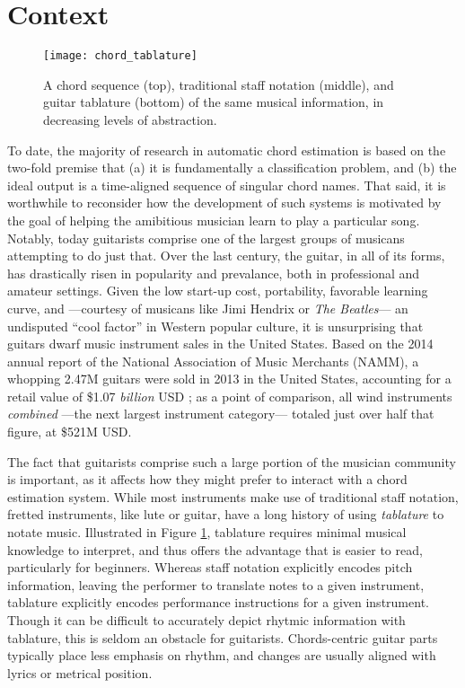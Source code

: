 \section{Context}
\label{sec:context}


\begin{figure}[t!]

  \centering
  \centerline{\texttt{[image: chord\_tablature]}}
\caption{A chord sequence (top), traditional staff notation (middle), and guitar tablature (bottom) of the same musical information, in decreasing levels of abstraction.}
\label{fig:chord_notation}
%
\end{figure}

To date, the majority of research in automatic chord estimation is based on the two-fold premise that (a) it is fundamentally a classification problem, and (b) the ideal output is a time-aligned sequence of singular chord names.
That said, it is worthwhile to reconsider how the development of such systems is motivated by the goal of helping the amibitious musician learn to play a particular song.
Notably, today guitarists comprise one of the largest groups of musicans attempting to do just that.
Over the last century, the guitar, in all of its forms, has drastically risen in popularity and prevalance, both in professional and amateur settings.
Given the low start-up cost, portability, favorable learning curve, and ---courtesy of musicans like Jimi Hendrix or \emph{The Beatles}--- an undisputed ``cool factor'' in Western popular culture, it is unsurprising that guitars dwarf music instrument sales in the United States.
Based on the 2014 annual report of the National Association of Music Merchants (NAMM), a whopping 2.47M guitars were sold in 2013 in the United States, accounting for a retail value of \$1.07 \emph{billion} USD \cite{NAMM2014}; as a point of comparison, all wind instruments \emph{combined} ---the next largest instrument category--- totaled just over half that figure, at \$521M USD.

The fact that guitarists comprise such a large portion of the musician community is important, as it affects how they might prefer to interact with a chord estimation system.
While most instruments make use of traditional staff notation, fretted instruments, like lute or guitar, have a long history of using \emph{tablature} to notate music.
Illustrated in Figure \ref{fig:chord_notation}, tablature requires minimal musical knowledge to interpret, and thus offers the advantage that is easier to read, particularly for beginners.
Whereas staff notation explicitly encodes pitch information, leaving the performer to translate notes to a given instrument, tablature explicitly encodes performance instructions for a given instrument.
Though it can be difficult to accurately depict rhytmic information with tablature, this is seldom an obstacle for guitarists.
Chords-centric guitar parts typically place less emphasis on rhythm, and changes are usually aligned with lyrics or metrical position.

